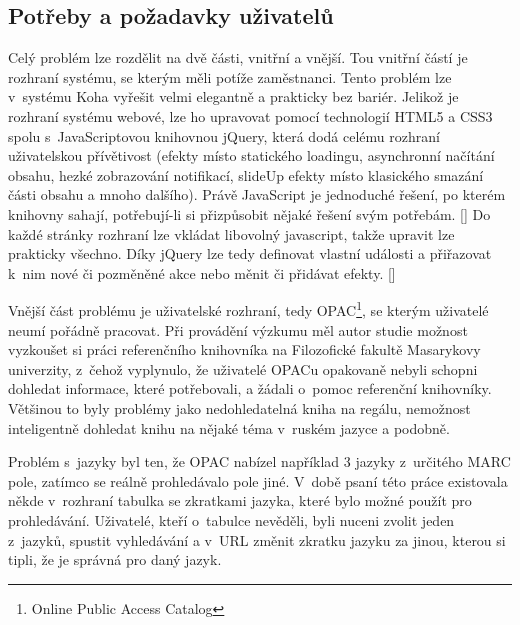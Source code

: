 \documentclass[
	11pt, oneside, printed, final, palatino, monochrome
	microtype,
	table,   %
	lof,     %
	lot     %
]{fithesis3}
\newcommand{\citepages}[2]{[\cite[#1]{#2}]}
\begin{document}
{\subsection{Potřeby a požadavky uživatelů}
Celý problém lze rozdělit na dvě části, vnitřní a vnější. Tou vnitřní částí je rozhraní systému, se kterým měli potíže zaměstnanci. Tento problém lze v~systému Koha vyřešit velmi elegantně a prakticky bez bariér. Jelikož je rozhraní systému webové, lze ho upravovat pomocí technologií HTML5 a CSS3 spolu s~JavaScriptovou knihovnou jQuery, která dodá celému rozhraní uživatelskou přívětivost (efekty místo statického loadingu, asynchronní načítání obsahu, hezké zobrazování notifikací, slideUp efekty místo klasického smazání části obsahu a mnoho dalšího). Právě JavaScript je jednoduché řešení, po kterém knihovny sahají, potřebují-li si přizpůsobit nějaké řešení svým potřebám. \citepages{80-82}{Denar2015thesis} Do každé stránky rozhraní lze vkládat libovolný javascript, takže upravit lze prakticky všechno. Díky jQuery lze tedy definovat  vlastní události a přiřazovat k~nim nové či pozměněné akce nebo měnit či přidávat efekty. \citepages{3-9}{IYiYMQHMhgWYsu4q}

Vnější část problému je uživatelské rozhraní, tedy OPAC\footnote{Online Public Access Catalog
}, se kterým uživatelé neumí pořádně pracovat. Při provádění výzkumu měl autor studie možnost vyzkoušet si práci referenčního knihovníka na Filozofické fakultě Masarykovy univerzity, z~čehož vyplynulo, že uživatelé OPACu opakovaně nebyli schopni dohledat informace, které potřebovali, a žádali o~pomoc referenční knihovníky. Většinou to byly problémy jako nedohledatelná kniha na regálu, nemožnost inteligentně dohledat knihu na nějaké téma v~ruském jazyce a podobně.

Problém s~jazyky byl ten, že OPAC nabízel například 3 jazyky z~určitého MARC pole, zatímco se reálně prohledávalo pole jiné. V~době psaní této práce existovala někde v~rozhraní tabulka se zkratkami jazyka, které bylo možné použít pro prohledávání. Uživatelé, kteří o~tabulce nevěděli, byli nuceni zvolit jeden z~jazyků, spustit vyhledávání a v~URL změnit zkratku jazyku za jinou, kterou si tipli, že je správná pro daný jazyk.

}
\end{document}
